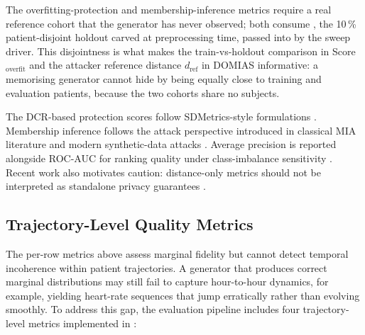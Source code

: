 The overfitting-protection and membership-inference metrics require a real reference cohort that the generator has never observed; both consume , the 10\,\% patient-disjoint holdout carved at preprocessing time, passed into  by the sweep driver. This disjointness is what makes the train-vs-holdout comparison in Score$_{\text{overfit}}$ and the attacker reference distance $d_{\text{ref}}$ in DOMIAS informative: a memorising generator cannot hide by being equally close to training and evaluation patients, because the two cohorts share no subjects.

The DCR-based protection scores follow SDMetrics-style formulations \cite{sdmetricsPrivacyDocs}. Membership inference follows the attack perspective introduced in classical MIA literature and modern synthetic-data attacks \cite{shokri2017membership,breugel2023domias}. Average precision is reported alongside ROC-AUC for ranking quality under class-imbalance sensitivity \cite{davisGoadrich2006}. Recent work also motivates caution: distance-only metrics should not be interpreted as standalone privacy guarantees \cite{yao2025dcrdelusion}.

\subsection{Trajectory-Level Quality Metrics}

The per-row metrics above assess marginal fidelity but cannot detect temporal incoherence within patient trajectories. A generator that produces correct marginal distributions may still fail to capture hour-to-hour dynamics, for example, yielding heart-rate sequences that jump erratically rather than evolving smoothly. To address this gap, the evaluation pipeline includes four trajectory-level metrics implemented in :

